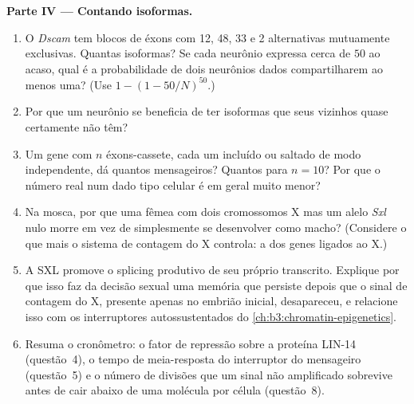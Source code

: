 \begin{problem}
\medskip
\noindent\textbf{Parte IV --- Contando isoformas.}
\begin{enumerate}[resume]
  \item O \emph{Dscam} tem blocos de éxons com 12, 48, 33 e 2
        alternativas mutuamente exclusivas. Quantas isoformas? Se cada
        neurônio expressa cerca de $50$ ao acaso, qual é a
        probabilidade de dois neurônios dados compartilharem ao
        menos uma? (Use $1 - (1 -
        50/N)^{50}$.)
  \item Por que um neurônio se beneficia de ter isoformas que seus
        vizinhos quase certamente não têm?
  \item Um gene com $n$ éxons-cassete, cada um incluído ou saltado de
        modo independente, dá quantos mensageiros? Quantos para
        $n = 10$? Por que o número real num dado tipo celular é em
        geral muito menor?
  \item Na mosca, por que uma fêmea com dois cromossomos X mas um
        alelo \emph{Sxl} nulo morre em vez de simplesmente se
        desenvolver como macho? (Considere o que mais o sistema de
        contagem do X controla: a  dos genes
        ligados ao X.)
  \item A SXL promove o splicing produtivo de seu próprio transcrito.
        Explique por que isso faz da decisão sexual uma memória que
        persiste depois que o sinal de contagem do X, presente apenas
        no embrião inicial, desapareceu, e relacione isso com os
        interruptores autossustentados do
        \cref{ch:b3:chromatin-epigenetics}.
  \item Resuma o cronômetro: o fator de repressão sobre a proteína
        LIN-14 (questão~4), o tempo de meia-resposta do interruptor do
        mensageiro (questão~5) e o número de divisões que um sinal não
        amplificado sobrevive antes de cair abaixo de uma molécula por
        célula (questão~8).
\end{enumerate}
\end{problem}
